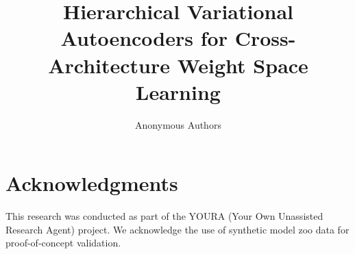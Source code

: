 \documentclass[twocolumn]{article}
\begin{document}
\title{Hierarchical Variational Autoencoders for Cross-Architecture Weight Space Learning}
\author{Anonymous Authors}
\date{}
\maketitle











\section*{Acknowledgments}
This research was conducted as part of the YOURA (Your Own Unassisted Research Agent) project. We acknowledge the use of synthetic model zoo data for proof-of-concept validation.



\end{document}
